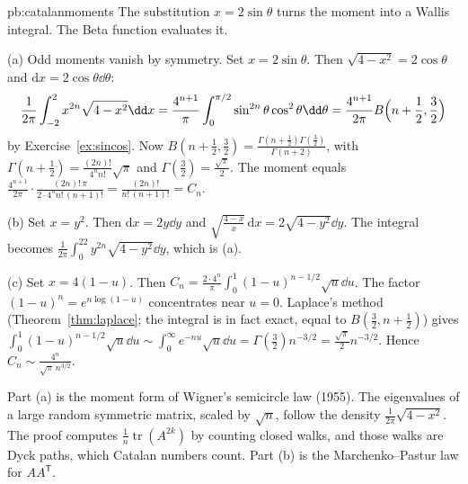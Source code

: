 \begin{solution}{pb:catalanmoments}
\idea The substitution $x=2\sin\theta$ turns the moment into a Wallis integral. The Beta function evaluates it.

\writeup (a) Odd moments vanish by symmetry. Set $x=2\sin\theta$. Then $\sqrt{4-x^2}=2\cos\theta$ and $\mathrm dx=2\cos\theta\dd\theta$:
\[
\frac1{2\pi}\int_{-2}^2x^{2n}\sqrt{4-x^2}\dd x=\frac{4^{n+1}}{\pi}\int_0^{\pi/2}\sin^{2n}\theta\cos^2\theta\dd\theta=\frac{4^{n+1}}{2\pi}B\Bigl(n+\frac12,\frac32\Bigr)
\]
by Exercise~\ref{ex:sincos}. Now $B(n+\frac12,\frac32)=\frac{\Gamma(n+\frac12)\Gamma(\frac32)}{\Gamma(n+2)}$, with $\Gamma(n+\frac12)=\frac{(2n)!}{4^nn!}\sqrt\pi$ and $\Gamma(\frac32)=\frac{\sqrt\pi}2$. The
moment equals $\frac{4^{n+1}}{2\pi}\cdot\frac{(2n)!\,\pi}{2\cdot4^nn!\,(n+1)!}=\frac{(2n)!}{n!\,(n+1)!}=C_n$.

(b) Set $x=y^2$. Then $\mathrm dx=2y\dd y$ and $\sqrt{\frac{4-x}x}\,\mathrm dx=2\sqrt{4-y^2}\dd y$. The integral becomes $\frac1{2\pi}\int_0^22y^{2n}\sqrt{4-y^2}\dd y$, which is (a).

(c) Set $x=4(1-u)$. Then $C_n=\frac{2\cdot4^n}\pi\int_0^1(1-u)^{n-1/2}\sqrt u\dd u$. The factor $(1-u)^{n}=e^{n\log(1-u)}$ concentrates near $u=0$. Laplace's method
(Theorem~\ref{thm:laplace}; the integral is in fact exact, equal to $B(\frac32,n+\frac12)$) gives $\int_0^1(1-u)^{n-1/2}\sqrt u\dd u\sim\int_0^\infty e^{-nu}\sqrt u\dd u=\Gamma(\frac32)n^{-3/2}=\frac{\sqrt\pi}2n^{-3/2}$.
Hence $C_n\sim\frac{4^n}{\sqrt\pi\,n^{3/2}}$.

\leads Part (a) is the moment form of Wigner's semicircle law (1955). The eigenvalues of a large random symmetric matrix, scaled by
$\sqrt n$, follow the density $\frac1{2\pi}\sqrt{4-x^2}$. The proof computes $\frac1n\operatorname{tr}(A^{2k})$ by counting closed walks, and those walks
are Dyck paths, which Catalan numbers count. Part (b) is the Marchenko--Pastur law for $AA^{\mathsf T}$.
\end{solution}

